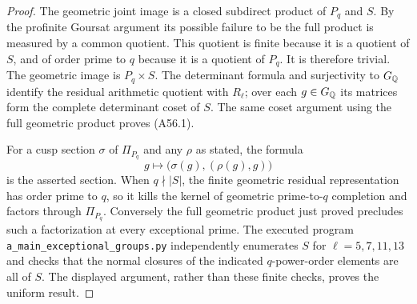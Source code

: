 \begin{proof}
The geometric joint image is a closed subdirect product of $P_q$ and
$S$. By the profinite Goursat argument its possible failure to be the
full product is measured by a common quotient. This quotient is finite
because it is a quotient of $S$, and of order prime to $q$ because it
is a quotient of $P_q$. It is therefore trivial. The geometric image
is $P_q\times S$. The determinant formula and surjectivity to $G_\mathbb Q$
identify the residual arithmetic quotient with $R_\ell$; over each
$g\in G_\mathbb Q$ its matrices form the complete determinant coset of $S$.
The same coset argument using the full geometric product proves
(A56.1).

For a cusp section $\sigma$ of $\Pi_{P_q}$ and any $\rho$ as stated,
the formula
\[
 g\longmapsto\bigl(\sigma(g),(\rho(g),g)\bigr)
\]
is the asserted section. When $q\nmid|S|$, the finite geometric
residual representation has order prime to $q$, so it kills the kernel
of geometric prime-to-$q$ completion and factors through $\Pi_{P_q}$.
Conversely the full geometric product just proved precludes such a
factorization at every exceptional prime. The executed program
\texttt{a\_main\_exceptional\_groups.py} independently enumerates
$S$ for $\ell=5,7,11,13$ and checks that the normal closures of the
indicated $q$-power-order elements are all of $S$. The displayed
argument, rather than these finite checks, proves the uniform result.
\end{proof}

